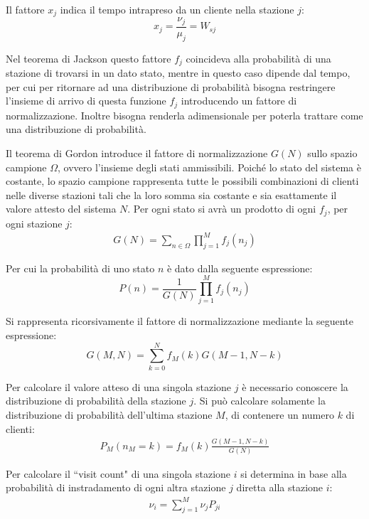 \documentclass{article}
\numberwithin{equation}{subsection}
\begin{document}
Il fattore $x_j$ indica il tempo intrapreso da un cliente nella stazione $j$:
\begin{equation}
    x_j=\displaystyle\frac{\nu_j}{\mu_j}=W_{sj}
\end{equation}

Nel teorema di Jackson questo fattore $f_j$ coincideva alla probabilità di una stazione di trovarsi in un dato stato, mentre in questo caso dipende 
dal tempo, per cui per ritornare ad una distribuzione di probabilità bisogna restringere l'insieme di arrivo di questa funzione $f_j$ introducendo 
un fattore di normalizzazione. Inoltre bisogna renderla adimensionale per poterla trattare come una distribuzione di probabilità. 

Il teorema di Gordon introduce il fattore di normalizzazione $G(N)$ sullo spazio campione $\Omega$, ovvero l'insieme degli stati ammissibili. Poiché 
lo stato del sistema è costante, lo spazio campione rappresenta tutte le possibili combinazioni di clienti nelle diverse stazioni tali che la loro 
somma sia costante e sia esattamente il valore attesto del sistema $N$. Per ogni stato si avrà un prodotto di ogni $f_j$, per ogni stazione $j$:
\begin{gather}
    G(N)=\displaystyle\sum_{n\in\Omega}\prod_{j=1}^Mf_j(n_j)
\end{gather}

Per cui la probabilità di uno stato $n$ è dato dalla seguente espressione:
\begin{equation}
    P(n)=\displaystyle\frac{1}{G(N)}\prod_{j=1}^Mf_j(n_j)
\end{equation}

Si rappresenta ricorsivamente il fattore di normalizzazione mediante la seguente espressione:
\begin{equation}
    G(M,N)=\displaystyle\sum_{k=0}^Nf_M(k)G(M-1,N-k)
\end{equation}

Per calcolare il valore atteso di una singola stazione $j$ è necessario conoscere la distribuzione di probabilità della stazione $j$. Si può calcolare solamente la 
distribuzione di probabilità dell'ultima stazione $M$, di contenere un numero $k$ di clienti:
\begin{gather}
    P_M(n_M=k)=\displaystyle f_M(k)\frac{G(M-1,N-k)}{G(N)}
\end{gather}

Per calcolare il ``visit count" di una singola stazione $i$ si determina in base alla probabilità di instradamento di ogni altra stazione $j$ diretta alla stazione $i$:
\begin{gather}
    \nu_i=\displaystyle\sum_{j=1}^M\nu_jP_{ji}
\end{gather}
\end{document}
